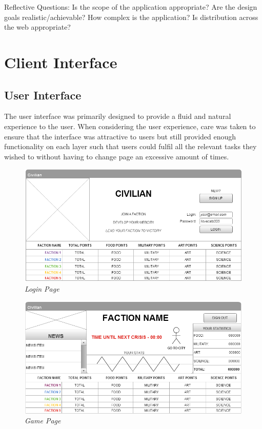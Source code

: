 \documentclass{sig-alt-release2}
\begin{document}
Reflective Questions: 
Is the scope of the application appropriate? 
Are the design goals realistic/achievable? 
How complex is the application? 
Is distribution across the web appropriate? 

\section{Client Interface}

\subsection{User Interface}

The user interface was primarily designed to provide a fluid and natural experience to the user. When considering the user experience, care was taken to ensure that the interface was attractive to users but still provided enough functionality on each layer such that users could fulfil all the relevant tasks they wished to without having to change page an excessive amount of times. \\

\begin{figure}[!htbp]
  \caption{\textit{Login Page}}
  \begin{center}
		\includegraphics[scale=0.25]{img/w3.png}
  \end{center}
\end{figure}

\begin{figure}[!htbp]
  \caption{\textit{Game Page}}
  \begin{center}
		\includegraphics[scale=0.25]{img/w4.png}
  \end{center}
\end{figure}
\end{document}
